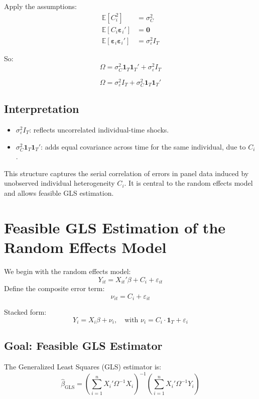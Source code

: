 \documentclass[12pt, oneside]{article}
\begin{document}
Apply the assumptions:
\begin{align*}
\mathbb{E}[C_i^2] &= \sigma_C^2 \\
\mathbb{E}[C_i \bm{\varepsilon}_i'] &= \bm{0} \\
\mathbb{E}[\bm{\varepsilon}_i \bm{\varepsilon}_i'] &= \sigma_\varepsilon^2 I_T
\end{align*}

So:
\[
\Omega = \sigma_C^2 \bm{1}_T \bm{1}_T' + \sigma_\varepsilon^2 I_T
\]

\[
\boxed{
\Omega = \sigma_\varepsilon^2 I_T + \sigma_C^2 \bm{1}_T \bm{1}_T'
}
\]

\subsection*{Interpretation}

\begin{itemize}
    \item \( \sigma_\varepsilon^2 I_T \): reflects uncorrelated individual-time shocks.
    \item \( \sigma_C^2 \bm{1}_T \bm{1}_T' \): adds equal covariance across time for the same individual, due to \( C_i \).
\end{itemize}

This structure captures the serial correlation of errors in panel data induced by unobserved individual heterogeneity \( C_i \). It is central to the random effects model and allows feasible GLS estimation.

\section*{Feasible GLS Estimation of the Random Effects Model}

We begin with the random effects model:
\[
Y_{it} = X_{it}' \beta + C_i + \varepsilon_{it}
\]
Define the composite error term:
\[
\nu_{it} = C_i + \varepsilon_{it}
\]

Stacked form:
\[
Y_i = X_i \beta + \nu_i, \quad \text{with } \nu_i = C_i \cdot \bm{1}_T + \varepsilon_i
\]

\subsection*{Goal: Feasible GLS Estimator}

The Generalized Least Squares (GLS) estimator is:
\[
\hat{\beta}_{\text{GLS}} = \left( \sum_{i=1}^n X_i' \Omega^{-1} X_i \right)^{-1} \left( \sum_{i=1}^n X_i' \Omega^{-1} Y_i \right)
\]
\end{document}
